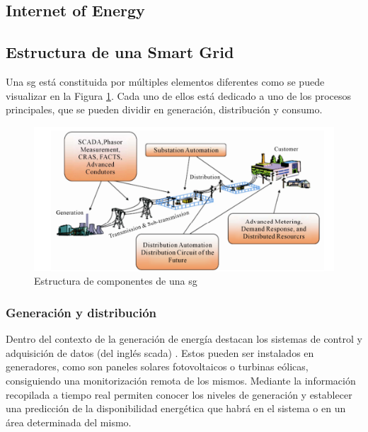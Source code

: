 \vspace{3mm}

\subsection{Internet of Energy}
\cite{ioe}




\subsection{Estructura de una Smart Grid}

Una \gls{sg} está constituida por múltiples elementos diferentes como se puede visualizar en la Figura \ref{fig:estructura_sg}. Cada uno de ellos está dedicado a uno de los procesos principales, que se pueden dividir en generación, distribución y consumo. \cite{smartgrid_overview}

\vspace{3mm}

\begin{figure}[h]
  \centering
  \includegraphics[width=1\textwidth]{img/teoria/estructura_sg.png}
  \caption{Estructura de componentes de una \gls{sg} \cite{smartgrid_overview}}
  \label{fig:estructura_sg}
\end{figure}

\subsubsection{Generación y distribución}

\vspace{3mm}

Dentro del contexto de la generación de energía destacan los sistemas de control y adquisición de datos (del inglés \gls{scada}) \cite{scada}. Estos pueden ser instalados en generadores, como son paneles solares fotovoltaicos o turbinas eólicas, consiguiendo una monitorización remota de los mismos. Mediante la información recopilada a tiempo real permiten conocer los niveles de generación y establecer una predicción de la disponibilidad energética que habrá en el sistema o en un área determinada del mismo.

